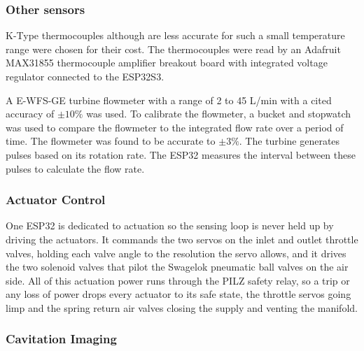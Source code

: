 \subsubsection{Other sensors}

K-Type thermocouples although are less accurate for such a small temperature range were chosen for their cost. The thermocouples were read by an Adafruit MAX31855 thermocouple amplifier breakout board with integrated voltage regulator connected to the ESP32S3. 

A E-WFS-GE turbine flowmeter with a range of 2 to 45 L/min with a cited accuracy of $\pm10\%$ was used. To calibrate the flowmeter, a bucket and stopwatch was used to compare the flowmeter to the integrated flow rate over a period of time. The flowmeter was found to be accurate to $\pm3\%$. The turbine generates pulses based on its rotation rate. The ESP32 measures the interval between these pulses to calculate the flow rate. %

\subsubsection{Actuator Control}

One ESP32 is dedicated to actuation so the sensing loop is never held up by driving the actuators. It commands the two servos on the inlet and outlet throttle valves, holding each valve angle to the resolution the servo allows, and it drives the two solenoid valves that pilot the Swagelok pneumatic ball valves on the air side. All of this actuation power runs through the PILZ safety relay, so a trip or any loss of power drops every actuator to its safe state, the throttle servos going limp and the spring return air valves closing the supply and venting the manifold.


\subsubsection{Cavitation Imaging}

